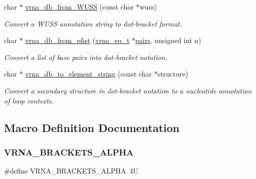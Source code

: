 \begin{DoxyCompactItemize}
char $\ast$ \hyperlink{group__struct__utils__dot__bracket_ga02ca70cffb2d864f7b2d95d92218bae0}{vrna\+\_\+db\+\_\+from\+\_\+\+W\+U\+SS} (const char $\ast$wuss)
\begin{DoxyCompactList}\small\item\em Convert a W\+U\+SS annotation string to dot-\/bracket format. \end{DoxyCompactList}\item 
char $\ast$ \hyperlink{group__struct__utils__dot__bracket_ga6a51a36b9245d0bac868c5cd172b9611}{vrna\+\_\+db\+\_\+from\+\_\+plist} (\hyperlink{group__struct__utils__plist_gab9ac98ab55ded9fb90043b024b915aca}{vrna\+\_\+ep\+\_\+t} $\ast$\hyperlink{group__struct__utils__deprecated_ga6341cbb704924824e0236c1dce791032}{pairs}, unsigned int n)
\begin{DoxyCompactList}\small\item\em Convert a list of base pairs into dot-\/bracket notation. \end{DoxyCompactList}\item 
char $\ast$ \hyperlink{group__struct__utils__dot__bracket_ga45360c09fb6d04d96e42dcccbb66015b}{vrna\+\_\+db\+\_\+to\+\_\+element\+\_\+string} (const char $\ast$structure)
\begin{DoxyCompactList}\small\item\em Convert a secondary structure in dot-\/bracket notation to a nucleotide annotation of loop contexts. \end{DoxyCompactList}\end{DoxyCompactItemize}


\subsection{Macro Definition Documentation}
\mbox{\label{group__struct__utils__dot__bracket_ga7e3f630af8d69bb0e917145aacf2f96d}} 
\subsubsection{\texorpdfstring{V\+R\+N\+A\+\_\+\+B\+R\+A\+C\+K\+E\+T\+S\+\_\+\+A\+L\+P\+HA}{VRNA\_BRACKETS\_ALPHA}}
{\footnotesize\ttfamily \#define V\+R\+N\+A\+\_\+\+B\+R\+A\+C\+K\+E\+T\+S\+\_\+\+A\+L\+P\+HA~4U}



